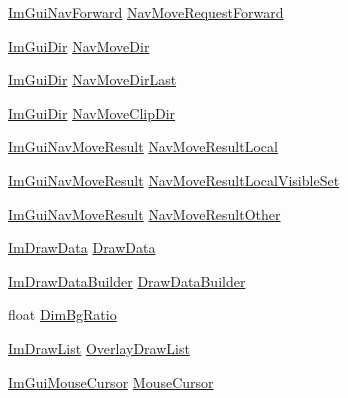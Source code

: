 \begin{DoxyCompactItemize}
\item 
\mbox{\hyperlink{imgui__internal_8h_a53d6374f774bfdc522d90c1b7a16a096}{Im\+Gui\+Nav\+Forward}} \mbox{\hyperlink{struct_im_gui_context_a96fd534ce6bec43e3b23cb71cda1b62c}{Nav\+Move\+Request\+Forward}}
\item 
\mbox{\hyperlink{imgui_8h_a874086389bc27cc9647118d22a806403}{Im\+Gui\+Dir}} \mbox{\hyperlink{struct_im_gui_context_a20208736529ff4a1067d8d15ef17400b}{Nav\+Move\+Dir}}
\item 
\mbox{\hyperlink{imgui_8h_a874086389bc27cc9647118d22a806403}{Im\+Gui\+Dir}} \mbox{\hyperlink{struct_im_gui_context_a74b9822c7771e7c331d72e0862910243}{Nav\+Move\+Dir\+Last}}
\item 
\mbox{\hyperlink{imgui_8h_a874086389bc27cc9647118d22a806403}{Im\+Gui\+Dir}} \mbox{\hyperlink{struct_im_gui_context_a445c588479dbf5122c062ba8bcdb99e2}{Nav\+Move\+Clip\+Dir}}
\item 
\mbox{\hyperlink{struct_im_gui_nav_move_result}{Im\+Gui\+Nav\+Move\+Result}} \mbox{\hyperlink{struct_im_gui_context_ad7d98d5f91fbbe9b0dacee866832ea6d}{Nav\+Move\+Result\+Local}}
\item 
\mbox{\hyperlink{struct_im_gui_nav_move_result}{Im\+Gui\+Nav\+Move\+Result}} \mbox{\hyperlink{struct_im_gui_context_a234e82aaa932f5cc000b274453b74942}{Nav\+Move\+Result\+Local\+Visible\+Set}}
\item 
\mbox{\hyperlink{struct_im_gui_nav_move_result}{Im\+Gui\+Nav\+Move\+Result}} \mbox{\hyperlink{struct_im_gui_context_a850becf9154be7f47580cfebc9f80127}{Nav\+Move\+Result\+Other}}
\item 
\mbox{\hyperlink{struct_im_draw_data}{Im\+Draw\+Data}} \mbox{\hyperlink{struct_im_gui_context_ac52ed6f3c516266f2c7a1e393693349b}{Draw\+Data}}
\item 
\mbox{\hyperlink{struct_im_draw_data_builder}{Im\+Draw\+Data\+Builder}} \mbox{\hyperlink{struct_im_gui_context_a73b17849eb0d2d1d5848493c6762e5a8}{Draw\+Data\+Builder}}
\item 
float \mbox{\hyperlink{struct_im_gui_context_af5761a79ad40a0b0fbdb1376ce0af4a1}{Dim\+Bg\+Ratio}}
\item 
\mbox{\hyperlink{struct_im_draw_list}{Im\+Draw\+List}} \mbox{\hyperlink{struct_im_gui_context_abc8e0592d9beea307d78661df0a38b1a}{Overlay\+Draw\+List}}
\item 
\mbox{\hyperlink{imgui_8h_a9223d6c82bb5d12c2eab5f829ca520ef}{Im\+Gui\+Mouse\+Cursor}} \mbox{\hyperlink{struct_im_gui_context_ab60730c7f9f601fd0b22dac060a822e3}{Mouse\+Cursor}}
\item 

\end{DoxyCompactItemize}
